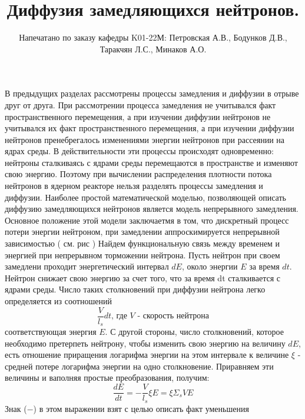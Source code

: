 \documentclass[a4paper]{article}
\title{Диффузия замедляющихся нейтронов.}
\author{
    Напечатано по заказу кафедры
    \newline
    K01-22М:
    Петровская А.В., Бодунков Д.В.,
    Таракчян Л.С., Минаков А.О.}
\begin{document}
    \maketitle

    В предыдущих разделах рассмотрены процессы замедления
    и диффузии в отрыве друг от друга. При рассмотрении процесса
    замедления не учитывался факт пространственного перемещения,
    а при изучении диффузии нейтронов не учитывался их факт
    пространственного перемещения, а при изучении диффузии нейтронов
    пренебрегалось изменениями энергии нейтронов при рассеянии на
    ядрах среды. В действительности эти процессы происходят
    одновременно: нейтроны сталкиваясь с ядрами среды перемещаются
    в пространстве и изменяют свою энергию. Поэтому при вычислении
    распределения плотности потока нейтронов в ядерном реакторе
    нельзя разделять процессы замедления и диффузии. Наиболее
    простой математической моделью, позволяющей описать диффузию
    замедляющихся нейтронов является модель непрерывного замедления.
    \newline
    Основное положение этой модели заключаетмя в том, что
    дискретный процесс потери энергии нейтроном, при замедлении
    аппроскимируется непрерывной зависимостью ( см. рис )
    \newline
    Найдем функциональную связь между временем и энергией
    при непрерывном торможении нейтрона. Пусть нейтрон при
    своем замедлени проходит энергетический интервал $dE$,
    около энергии $E$ за время $dt$. Нейтрон снижает свою
    энергию за счет того, что за время dt сталкивается с ядрами среды.
    \newline
    Число таких столкновений при диффузии нейтрона легко определяется 
    из соотношений
    \begin{equation}
        \frac{V}{l_s}dt
        \text{, где $V$ - скорость нейтрона}
    \end{equation}
    соответствующая энергия $E$.
    \newline
    С другой стороны, число столкновений, которое необходимо
    претерпеть нейтрону, чтобы изменить свою энергию на величину $dE$,
    есть отношение приращения логарифма энергии на этом интервале к
    величине $\xi$ - средней потере логарифма энергии на одно
    столкновение. Приравняем эти величины и ваполняя простые
    преобразования, получим:
    \begin{equation}
        \frac{dE}{dt} = -\frac{V}{l_s}\xi E = \xi \Sigma_s V E
    \end{equation}
    Знак ($-$) в этом выражении взят с целью описать факт уменьшения
\end{document}
